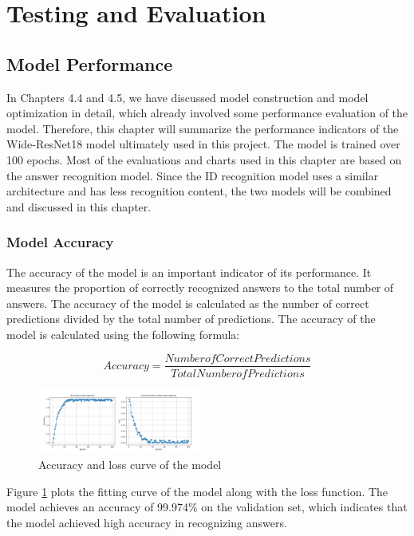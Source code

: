 \documentclass[twocolumn]{article}
\begin{document}
    

\section{Testing and Evaluation}

    \subsection{Model Performance}
    In Chapters 4.4 and 4.5, we have discussed model construction and model optimization in detail, which already involved some performance evaluation of the model. Therefore, this chapter will summarize the performance indicators of the Wide-ResNet18 model ultimately used in this project. The model is trained over 100 epochs. Most of the evaluations and charts used in this chapter are based on the answer recognition model. Since the ID recognition model uses a similar architecture and has less recognition content, the two models will be combined and discussed in this chapter.

    \subsubsection{Model Accuracy} 
    The accuracy of the model is an important indicator of its performance. It measures the proportion of correctly recognized answers to the total number of answers. The accuracy of the model is calculated as the number of correct predictions divided by the total number of predictions. The accuracy of the model is calculated using the following formula:

    \begin{equation}
        Accuracy = \frac{Number of Correct Predictions}{Total Number of Predictions}
    \end{equation}

    \begin{figure}[ht]
        \centering
        \includegraphics[width=0.48\textwidth]{loss_acc.png}
        \caption{Accuracy and loss curve of the model}
        \label{fig:acc_loss}
    \end{figure}

    Figure \ref*{fig:acc_loss} plots the fitting curve of the model along with the loss function. The model achieves an accuracy of 99.974\% on the validation set, which indicates that the model achieved high accuracy in recognizing answers.
\end{document}
